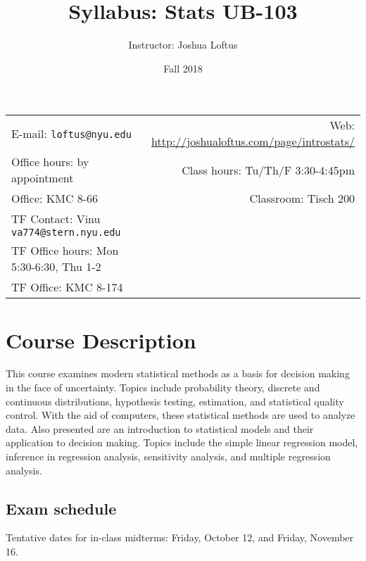 \documentclass[11pt]{article}
\title{Syllabus: Stats UB-103}
\author{Instructor: Joshua Loftus}
\date{Fall 2018}
\newcommand{\blankline}{\quad\pagebreak[2]}
\begin{document}
\maketitle

\blankline

\begin{tabular*}{.93\textwidth}{@{\extracolsep{\fill}}lr}


E-mail: \texttt{loftus@nyu.edu} & Web: \url{http://joshualoftus.com/page/introstats/}  \\

 Office hours: by appointment  &  Class hours: Tu/Th/F 3:30-4:45pm \\

 Office: KMC 8-66 & Classroom: Tisch 200 \\
TF Contact: Vinu \texttt{va774@stern.nyu.edu} & \\
TF Office hours: Mon 5:30-6:30, Thu 1-2 &  \\
TF Office: KMC 8-174 \\
\hline
\end{tabular*}

\vspace{5 mm}


\section*{Course Description}

This course examines modern statistical methods as a basis for decision making in the face of uncertainty. Topics include probability theory, discrete and continuous distributions, hypothesis testing, estimation, and statistical quality control. With the aid of computers, these statistical methods are used to analyze data. Also presented are an introduction to statistical models and their application to decision making. Topics include the simple linear regression model, inference in regression analysis, sensitivity analysis, and multiple regression analysis.

\subsection*{Exam schedule}

Tentative dates for in-class midterms: Friday, October 12, and Friday, November 16.
\end{document}
